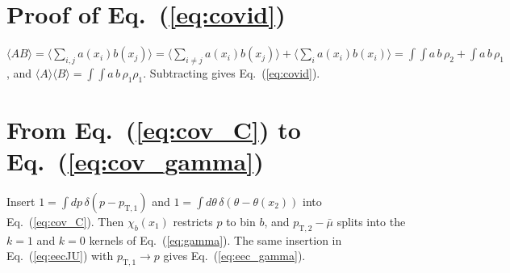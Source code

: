 \documentclass[11pt,a4paper]{article}
\begin{document}
\appendix
\section{Proof of Eq.~(\ref{eq:covid})}
\label{app:covid}
$\langle AB\rangle=\big\langle\sum_{i,j}a(x_i)b(x_j)\big\rangle=\big\langle\sum_{i\neq j}a(x_i)b(x_j)\big\rangle+\big\langle\sum_i a(x_i)b(x_i)\big\rangle
=\int\!\!\int a\,b\,\rho_2+\int a\,b\,\rho_1$, and $\langle A\rangle\langle B\rangle=\int\!\!\int a\,b\,\rho_1\rho_1$. Subtracting gives Eq.~(\ref{eq:covid}).

\section{From Eq.~(\ref{eq:cov_C}) to Eq.~(\ref{eq:cov_gamma})}
Insert $1=\int dp\,\delta(p-p_{\mathrm{T},1})$ and $1=\int d\theta\,\delta(\theta-\theta(x_2))$ into Eq.~(\ref{eq:cov_C}). Then $\chi_b(x_1)$ restricts $p$ to bin $b$, and $p_{\mathrm{T},2}-\bar\mu$ splits into the $k=1$ and $k=0$ kernels of Eq.~(\ref{eq:gamma}). The same insertion in Eq.~(\ref{eq:eecJU}) with $p_{\mathrm{T},1}\to p$ gives Eq.~(\ref{eq:eec_gamma}).



\end{document}
